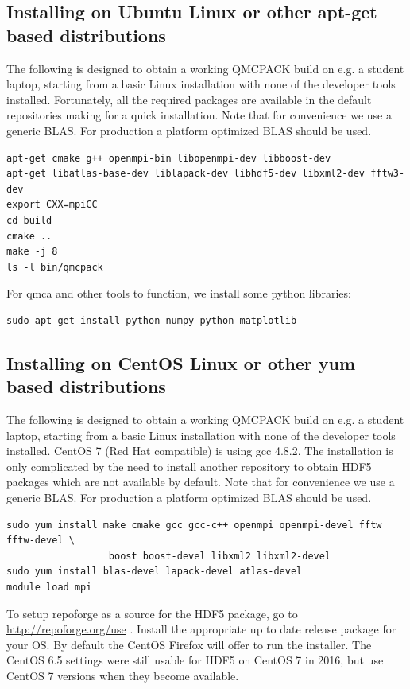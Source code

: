 \subsection{Installing on Ubuntu Linux or other apt-get based distributions}
\label{sec:buildubuntu}

The following is designed to obtain a working QMCPACK build on e.g. a
student laptop, starting from a basic Linux installation with none of
the developer tools installed. Fortunately, all the required packages
are available in the default repositories making for a quick
installation. Note that for convenience we use a generic BLAS. For
production a platform optimized BLAS should be used.

\begin{verbatim}
apt-get cmake g++ openmpi-bin libopenmpi-dev libboost-dev
apt-get libatlas-base-dev liblapack-dev libhdf5-dev libxml2-dev fftw3-dev
export CXX=mpiCC
cd build
cmake ..
make -j 8
ls -l bin/qmcpack
\end{verbatim}

For qmca and other tools to function, we install some python libraries:
\begin{verbatim}
sudo apt-get install python-numpy python-matplotlib
\end{verbatim}

\subsection{Installing on CentOS Linux or other yum based distributions}

The following is designed to obtain a working QMCPACK build on e.g. a
student laptop, starting from a basic Linux installation with none of
the developer tools installed. CentOS 7 (Red Hat compatible) is using
gcc 4.8.2. The installation is only complicated by the need to install
another repository to obtain HDF5 packages which are not available by
default. Note that for convenience we use a generic BLAS. For
production a platform optimized BLAS should be used.

\begin{verbatim}
sudo yum install make cmake gcc gcc-c++ openmpi openmpi-devel fftw fftw-devel \
                  boost boost-devel libxml2 libxml2-devel
sudo yum install blas-devel lapack-devel atlas-devel
module load mpi
\end{verbatim}

To setup repoforge as a source for the HDF5 package, go to
\url{http://repoforge.org/use} . Install the appropriate up to date
release package for your OS. By default the CentOS Firefox will offer
to run the installer. The CentOS 6.5 settings were still usable for HDF5 on
CentOS 7 in 2016, but use CentOS 7 versions when they become
available.

